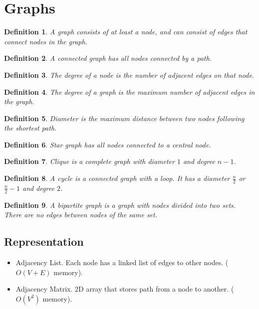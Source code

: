 \documentclass[10pt,landscape,a4paper]{article}
\newtheorem{definition}{Definition}[section]
\begin{document}
\begin{multicols*}{4}
\begin{itemize}
\end{itemize}

\section{Graphs}
\begin{definition}
    A graph consists of at least a node, and can consist of edges that connect nodes in the graph.
\end{definition}
\begin{definition}
    A connected graph has all nodes connected by a path.
\end{definition}
\begin{definition}
    The degree of a node is the number of adjacent edges on that node.
\end{definition}
\begin{definition}
    The degree of a graph is the maximum number of adjacent edges in the graph.
\end{definition}
\begin{definition}
    Diameter is the maximum distance between two nodes following the shortest path.
\end{definition}
\begin{definition}
    Star graph has all nodes connected to a central node.
\end{definition}
\begin{definition}
    Clique is a complete graph with diameter $1$ and degree $n-1$.
\end{definition}
\begin{definition}
    A cycle is a connected graph with a loop. It has a diameter $\frac{n}{2}$ or $\frac{n}{2}-1$ and degree $2$.
\end{definition}
\begin{definition}
    A bipartite graph is a graph with nodes divided into two sets. There are no edges between nodes of the same set.
\end{definition}

\subsection{Representation}
\begin{itemize}
    \item Adjacency List. Each node has a linked list of edges to other nodes. ($O(V+E)$ memory).
    \item Adjacency Matrix. 2D array that stores path from a node to another. ($O(V^2)$ memory).
\end{itemize}


\end{multicols*}
\end{document}
